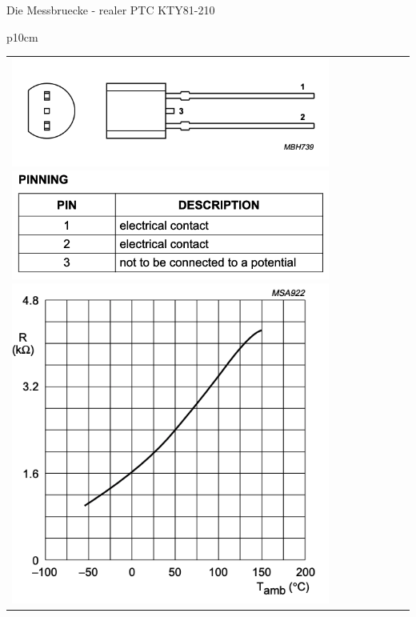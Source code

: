 \begin{frame}[t]{Die Messbruecke - realer PTC KTY81-210}
\begin{spacing}{0.9}
\begin{tiny}
\begin{table}[h!]
\begin{tabular}{p{10cm}}
\begin{minipage}{\textwidth}
                        \begin{tabular}{p{3cm} p{8cm}}
                            \begin{minipage}{.3\textwidth}
                                \includegraphics[width=0.8\linewidth]{pictures/kty81_overview.png}
                                \includegraphics[width=0.8\linewidth]{pictures/kty81_pinning.png}
                                \includegraphics[width=0.8\linewidth]{pictures/kty81_graph.png}
                            \end{minipage}
                             &
                            \begin{minipage}{.7\textwidth}
                                \begin{figure}
                                    \centering

\end{figure}
\end{minipage}
\end{tabular}
\end{minipage}
\end{tabular}
\end{table}
\end{tiny}
\end{spacing}
\end{frame}
